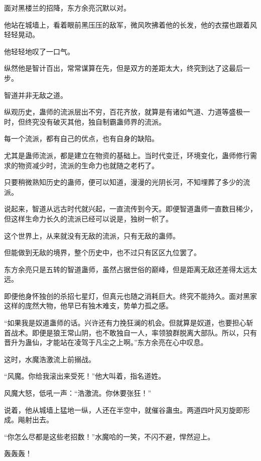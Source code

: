 
\begin{this_body}

面对黑楼兰的招降，东方余亮沉默以对。

他站在城墙上，看着眼前黑压压的敌军，微风吹拂着他的长发，他的衣摆也跟着风轻轻晃动。

他轻轻地叹了一口气。

纵然他是智计百出，常常谋算在先，但是双方的差距太大，终究到达了这最后一步。

智道并非无敌之道。

纵观历史，蛊师的流派层出不穷，百花齐放，就算是有诸如气道、力道等盛极一时，但终究没有破灭其他，独自制霸蛊师界的流派。

每一个流派，都有自己的优点，也有自身的缺陷。

尤其是蛊师流派，都是建立在物资的基础上。当时代变迁，环境变化，蛊师修行需求的物资减少时，流派的生命力也就随之老朽了。

只要稍微熟知历史的蛊师，便可以知道，漫漫的光阴长河，不知埋葬了多少的流派。

说起来，智道从远古时代就兴起，一直流传到今天。即便智道蛊师一直数目稀少，但这样生命力长久的流派已经可以说是，独树一帜了。

这个世界上，从来就没有无敌的流派，只有无敌的蛊师。

但能做到无敌的境界，整个历史中，也不过只有区区九位罢了。

东方余亮只是五转的智道蛊师，虽然占据世俗的巅峰，但是距离无敌还差得太远太远。

即便他身怀独创的杀招七星灯，但真元也随之消耗巨大。终究不能持久。面对黑家这样的庞然大物，他早已有独木难支，势单力孤之感。

“如果我是奴道蛊师的话。兴许还有力挽狂澜的机会。但就算是奴道，也要担心斩首战术。即便是狼王常山阴，也不敢独自一人，率领狼群脱离大部队。所以，只有晋升为蛊仙，才能站在凌驾于凡尘之上啊。”东方余亮在心中叹息。

这时，水魔浩激流上前搦战。

“风魔。你给我滚出来受死！”他大叫着，指名道姓。

风魔大怒，低吼一声：“浩激流。你休要张狂！”

说着，他从城墙上猛地一纵，人还在半空中，就催谷蛊虫。两道四叶风刃旋即形成。飚射出去。

“你怎么尽都是这些老招数！”水魔哈的一笑，不闪不避，悍然迎上。

轰轰轰！


\end{this_body}
